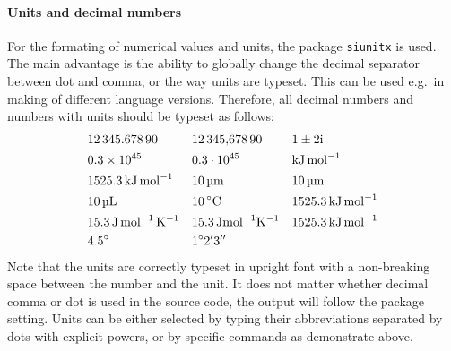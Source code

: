 \documentclass{article}
\begin{document}
\paragraph{Units and decimal numbers}For the formating of numerical values and units, the package \texttt{siunitx} is used. The main advantage is the ability to globally change the decimal separator between dot and comma, or the way units are typeset. This can be used e.g.\ in making of different language versions. Therefore, all decimal numbers and numbers with units should be typeset as follows:
\begin{align*}
&\num{12345,67890}                                 &
&\num[output-decimal-marker = {,}]{12345.67890}    &
&\complexnum{1+-2i}                                       \\
&\num{0.3e45}                                      &
&\num[exponent-product = \ensuremath{{}\cdot{}}]{0.3e45}            &
&\unit{kJ.mol^{-1}}                                  \\
&\qty{1525.3}{kJ.mol^{-1}}                          &
&\qty{10}{\micro\metre}                             &
&\qty{10}{\um}                                      \\
&\qty{10}{\ul}                                      &
&\qty{10}{\degreeCelsius}                           &
&\qty{1525.3}{\kJ\per\mol}                          \\
&\qty{15.3}{\joule\per\mole\per\kelvin}             &
&\qty[inter-unit-product = \ensuremath{{}\cdot{}}]{15.3}{\J\mol^{-1}\K^{-1}} &
&\qty{1525.3}{kJ.mol^{-1}}                          \\
&\ang{4,5}                                         &
&\ang{1;2;3}                                       &
\end{align*}
Note that the units are correctly typeset in upright font with a non-breaking space between the number and the unit. It does not matter whether decimal comma or dot is used in the source code, the output will follow the package setting. Units can be either selected by typing their abbreviations separated by dots with explicit powers, or by specific commands as demonstrate above.
\end{document}
